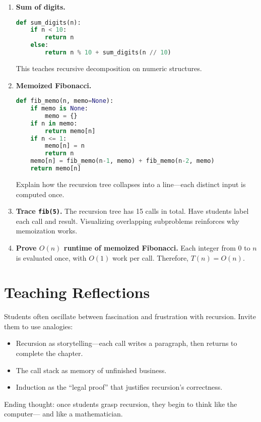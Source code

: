 \begin{enumerate}
  \item \textbf{Sum of digits.}
  \begin{lstlisting}[language=Python]
def sum_digits(n):
    if n < 10:
        return n
    else:
        return n % 10 + sum_digits(n // 10)
  \end{lstlisting}
  This teaches recursive decomposition on numeric structures.

  \item \textbf{Memoized Fibonacci.}
  \begin{lstlisting}[language=Python]
def fib_memo(n, memo=None):
    if memo is None:
        memo = {}
    if n in memo:
        return memo[n]
    if n <= 1:
        memo[n] = n
        return n
    memo[n] = fib_memo(n-1, memo) + fib_memo(n-2, memo)
    return memo[n]
  \end{lstlisting}
  Explain how the recursion tree collapses into a line—each distinct input is computed once.

  \item \textbf{Trace \texttt{fib(5)}.}
  The recursion tree has 15 calls in total. Have students label each call and result.
  Visualizing overlapping subproblems reinforces why memoization works.

  \item \textbf{Prove $O(n)$ runtime of memoized Fibonacci.}
  Each integer from 0 to $n$ is evaluated once, with $O(1)$ work per call.
  Therefore, $T(n) = O(n)$.
\end{enumerate}

\section{Teaching Reflections}
Students often oscillate between fascination and frustration with recursion.
Invite them to use analogies:
\begin{itemize}
  \item Recursion as storytelling—each call writes a paragraph, then returns to complete the chapter.
  \item The call stack as memory of unfinished business.
  \item Induction as the “legal proof” that justifies recursion’s correctness.
\end{itemize}
Ending thought: once students grasp recursion, they begin to think like the computer—
and like a mathematician.

